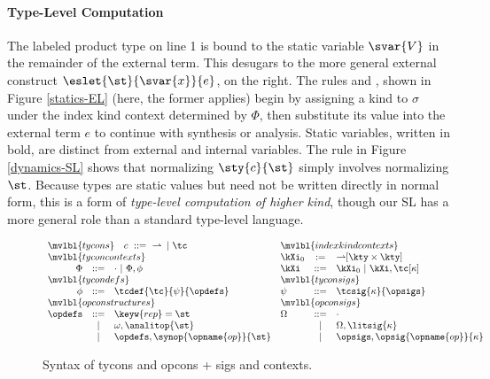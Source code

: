\paragraph{Type-Level Computation}
The labeled product type on line 1 is bound to the static variable $\svar{V}$  in the remainder of the external term. This  desugars to the more general external construct $\eslet{\st}{\svar{x}}{e}$, on the right. The rules  and , shown in Figure \ref{statics-EL}  (here, the former applies) begin by assigning a kind to $\sigma$ under the index kind context determined by $\Phi$, then substitute its value into the external term $e$ to continue with synthesis or analysis. Static variables, written in bold, are distinct from external and internal variables. The rule  in Figure \ref{dynamics-SL} shows that normalizing $\sty{c}{\st}$ simply involves normalizing $\st$. Because types are static values but need not be written directly in normal form, this is  a form of \emph{type-level computation of higher kind}, though our SL has a more general role than a standard type-level language. %


\begin{figure}[t]
\small
\hspace{-5px}$\begin{array}{rcllcl}
\multicolumn{3}{l}{\mvlbl{tycons}~~~c~::=~{\rightharpoonup}\,~|~ \tc} & \multicolumn{3}{l}{\mvlbl{index kind contexts}}\\
\multicolumn{3}{l}{\mvlbl{tycon contexts}} & \kXi_0 & := & {\rightharpoonup}[\kty \times \kty]\\
\Phi & ::= & \cdot ~|~ \Phi, \phi & \kXi & ::= & \kXi_0 ~|~ \kXi, \tc[\kappa]\\
\multicolumn{3}{l}{\mvlbl{tycon defs}} & \multicolumn{3}{l}{\mvlbl{tycon sigs}}\\
\phi & ::= & \tcdef{\tc}{\psi}{\opdefs}~~~~& \psi & ::= & \tcsig{\kappa}{\opsigs}\\
\multicolumn{3}{l}{\mvlbl{opcon structures}} & \multicolumn{3}{l}{\mvlbl{opcon sigs}}\\
\opdefs & ::= & \keyw{rep} = \st  & \Omega & ::= & \cdot\\
 & ~|~ & \omega, \analitop{\st} & & ~|~ & \Omega, \litsig{\kappa}\\
 & ~|~ & \opdefs, \synop{\opname{op}}{\st} & & ~|~ & \opsigs, \opsig{\opname{op}}{\kappa}
\end{array}$
\caption{Syntax of tycons and opcons + sigs and contexts.}
\label{syntax-TC}
\end{figure}

